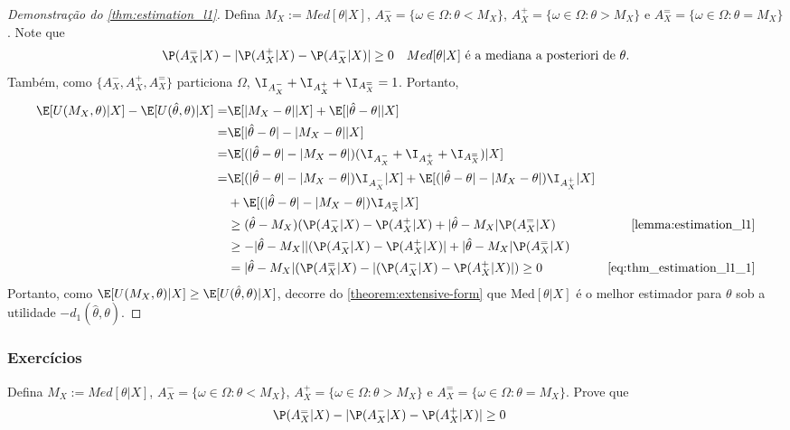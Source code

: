 \begin{proof}[Demonstração do \cref{thm:estimation_l1}]
 Defina $M_{X} := Med[\theta|X]$,
 $A^{-}_X = \{\omega \in \Omega: \theta < M_{X}\}$, 
 $A^{+}_X = \{\omega \in \Omega: \theta > M_{X}\}$ e 
 $A^{=}_{X} = \{\omega \in \Omega: \theta = M_{X}\}$.
 Note que
 \begin{align}
  \label{eq:thm_estimation_l1_1}
  \P(A^{=}_{X}|X)-|\P(A^{+}_{X}|X)-\P(A^{-}_{X}|X)| 
  &\geq 0
  & \text{$Med[\theta|X]$ é 
  a mediana a posteriori de $\theta$.}
 \end{align}
 Também, como 
 $\{A^{-}_X,A^{+}_X,A^{=}_X\}$ particiona $\Omega$,
 $\I_{A^{-}_X}+\I_{A^{+}_X}+\I_{A^{=}_X}=1$.
 Portanto,
 \begin{align*}
  \E[U(M_{X},\theta)|X] -\E[U(\hat{\theta},\theta)|X]
  =&\E[|M_{X}-\theta||X] +\E[|\hat{\theta}-\theta||X] \\
  =& \E[|\hat{\theta}-\theta|-|M_{X}-\theta||X] \\
  =& \E[(|\hat{\theta}-\theta|-|M_{X}-\theta|)(\I_{A^{-}_X}+\I_{A^{+}_X}+\I_{A^{=}_X})|X] \\
  =& \E[(|\hat{\theta}-\theta|-|M_{X}-\theta|)\I_{A^{-}_X}|X]
 +\E[(|\hat{\theta}-\theta|
 -|M_{X}-\theta|)\I_{A^{+}_X}|X]\\
 &+\E[(|\hat{\theta}
 -\theta|-|M_{X}-\theta|)\I_{A^{=}_X}|X]\\
 &\geq (\hat{\theta}-M_X)(\P(A^-_X|X)-\P(A^+_X|X)
 +|\hat{\theta}-M_X|\P(A^=_X|X)
 & \text{\cref{lemma:estimation_l1}} \\
 &\geq -|\hat{\theta}-M_X||(\P(A^-_X|X)-\P(A^+_X|X)|
 +|\hat{\theta}-M_X|\P(A^=_X|X) \\
 &= |\hat{\theta}-M_X|(\P(A^=_X|X)
 -|(\P(A^-_X|X)-\P(A^+_X|X)|) \geq 0
 & \text{\cref{eq:thm_estimation_l1_1}}
 \end{align*}
 Portanto, como 
 $\E[U(M_X,\theta)|X] \geq \E[U(\hat{\theta},\theta)|X]$,
 decorre do \cref{theorem:extensive-form} que
 $\text{Med}[\theta|X]$ é o melhor estimador para 
 $\theta$ sob a utilidade $-d_{1}(\hat{\theta},\theta)$.
\end{proof}

\subsubsection*{Exercícios}

\begin{exercise}
 Defina $M_{X} := Med[\theta|X]$,
 $A^{-}_X = \{\omega \in \Omega: \theta < M_{X}\}$, 
 $A^{+}_X = \{\omega \in \Omega: \theta > M_{X}\}$ e 
 $A^{=}_{X} = \{\omega \in \Omega: \theta = M_{X}\}$.
 Prove que
 \begin{align*}
  \P(A^{=}_{X}|X)
  -|\P(A^{-}_{X}|X)-\P(A^{+}_{X}|X)| 
  &\geq 0
 \end{align*}
\end{exercise}

